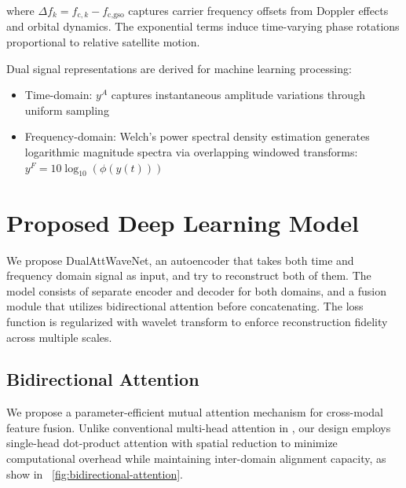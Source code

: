 \documentclass[conference]{IEEEtran}
\begin{document}
where $\Delta f_k = f_{\text{c},k} - f_{\text{c,gso}}$ captures carrier frequency offsets from Doppler effects and orbital dynamics. The exponential terms induce time-varying phase rotations proportional to relative satellite motion.

Dual signal representations are derived for machine learning processing:
\begin{itemize}
    \item Time-domain: $y^A$ captures instantaneous amplitude variations through uniform sampling
    \item Frequency-domain: Welch's power spectral density estimation generates logarithmic magnitude spectra via overlapping windowed transforms: $y^F = 10\log_{10}(\phi(y(t)))$
\end{itemize}

\section{Proposed Deep Learning Model}

We propose DualAttWaveNet, an autoencoder that takes both time and frequency domain signal as input, and try to reconstruct both of them. The model consists of separate encoder and decoder for both domains, and a fusion module that utilizes bidirectional attention before concatenating. The loss function is regularized with wavelet transform to enforce reconstruction fidelity across multiple scales.

\subsection{Bidirectional Attention}
\label{subsec:bi_attn}

We propose a parameter-efficient mutual attention mechanism for cross-modal feature fusion. Unlike conventional multi-head attention in \cite{vaswaniAttentionAllYou2017}, our design employs single-head dot-product attention with spatial reduction to minimize computational overhead while maintaining inter-domain alignment capacity, as show in  \figurename~\ref{fig:bidirectional-attention}.
\end{document}
